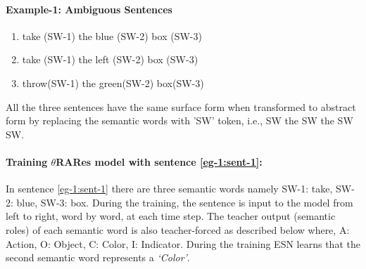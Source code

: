 \paragraph{Example-1: Ambiguous Sentences}

\begin{enumerate}[noitemsep]
\item take (SW-1) the blue (SW-2) box (SW-3) \label{eg-1:sent-1}
\item take (SW-1) the left (SW-2) box (SW-3) \label{eg-1:sent-2}
\item throw(SW-1) the green(SW-2) box(SW-3)  \label{eg-1:sent-3} 
\end{enumerate}

All the three sentences have the same surface form when transformed to abstract form by replacing the semantic words with 'SW' token, i.e., SW the SW the SW SW.

\paragraph{Training $\theta$RARes model with sentence \ref{eg-1:sent-1}:} In sentence \ref{eg-1:sent-1} there are three semantic words namely SW-1: take, SW-2: blue, SW-3: box. During the training, the sentence is input to the model from left to right, word by word, at each time step. The teacher output (semantic roles) of each semantic word is also teacher-forced as described below where, A: Action, O: Object, C: Color, I: Indicator. During the training ESN learns that the second semantic word represents a \textit{`Color'}.

